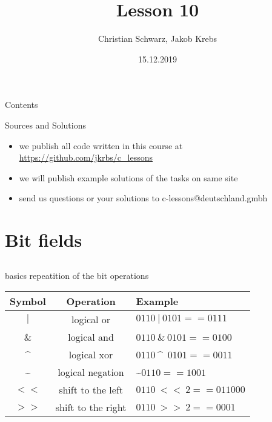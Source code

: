\documentclass[10pt,graphics,aspectratio=169,table]{beamer}
\title{Lesson 10}
\author{Christian Schwarz, Jakob Krebs}
\date{15.12.2019}
\begin{document}
\maketitle

\begin{frame}{Contents}
    \tableofcontents
\end{frame}

\begin{frame}{Sources and Solutions}
    \begin{itemize}
        \item we publish all code written in this course at \url{https://github.com/jkrbs/c_lessons}
        \item we will publish example solutions of the tasks on same site
        \item send us questions or your solutions to c-lessons@deutschland.gmbh
    \end{itemize}
\end{frame}

\section{Bit fields}
\subsection{}

\begin{frame}{basics}
repeatition of the bit operations

\begin{tabular}{|c|c|l|}
																						  	  \hline
		\textbf{Symbol} 	& \textbf{Operation} 	& \textbf{Example} 							\\\hline
		$|$					& logical or				& $0110\ |\ 0101 == 0111$ 		\\\hline
		$\&$ 				& logical and 				& $0110\ \&\ 0101 == 0100$ 	\\\hline
		\textasciicircum				& logical xor 				& $0110\ $\textasciicircum\ $0101 == 0011$ 	\\\hline
		\textasciitilde			& logical negation 			& \textasciitilde $0110 == 1001$	\\\hline
		$<<$ 			& shift to the left 			& $0110\ <<\ 2 == 011000$ 	\\\hline
		$>>$ 		& shift to the right 				& $0110\ >>\ 2 == 0001$ 			\\\hline
	\end{tabular}
	
\end{frame}
\end{document}
